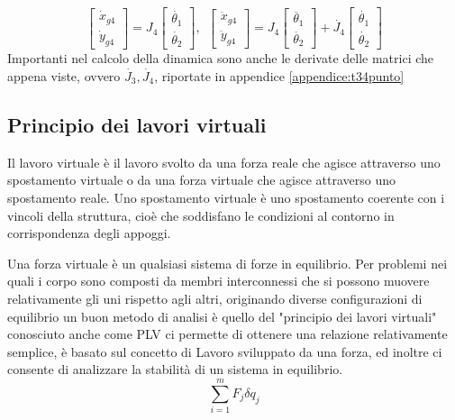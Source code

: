 \begin{equation*}
	\begin{bmatrix}
		\dot{x}_{g4} \\ \dot{y}_{g4}
	\end{bmatrix} = J_4 \begin{bmatrix}
		\dot{\theta_1} \\ \dot{\theta_2}
	\end{bmatrix} , \ \ 
	\begin{bmatrix}
		\ddot{x}_{g4} \\ \ddot{y}_{g4}
	\end{bmatrix} = J_4 \begin{bmatrix}
		\ddot{\theta_1} \\ \ddot{\theta_2}
	\end{bmatrix} + \dot{J_4} \begin{bmatrix}
		\dot{\theta_1} \\ \dot{\theta_2}
	\end{bmatrix}
\end{equation*}
Importanti nel calcolo della dinamica sono anche le derivate delle matrici che appena viste, ovvero $\dot{J_3}, \dot{J_4}$,  riportate in appendice \ref{appendice:t34punto}
\subsection{Principio dei lavori virtuali}
Il lavoro virtuale è il lavoro svolto da una forza reale che agisce attraverso uno spostamento virtuale o da una forza virtuale che agisce attraverso uno spostamento reale.
Uno spostamento virtuale è uno spostamento coerente con i vincoli della struttura, cioè che soddisfano le condizioni al contorno in corrispondenza degli appoggi.
\par Una forza virtuale è un qualsiasi sistema di forze in equilibrio.
Per problemi nei quali i corpo sono composti da membri interconnessi che si possono muovere relativamente gli uni rispetto agli altri, originando diverse configurazioni di equilibrio un buon metodo di analisi è quello del "principio dei lavori virtuali" conosciuto anche come PLV ci permette di ottenere una relazione relativamente semplice, è basato sul concetto di Lavoro sviluppato da una forza, ed inoltre ci consente di analizzare la stabilità di un sistema in equilibrio.
\begin{equation}
    \sum_{i=1}^m F_j\delta q_j\label{eq:din}
\end{equation}
